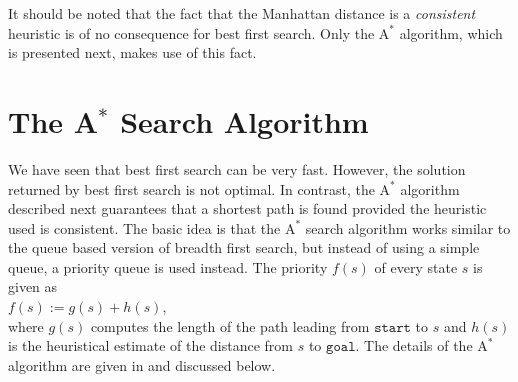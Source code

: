 It should be noted that the fact that the Manhattan distance is a \emph{\color{blue}consistent} heuristic is of
no consequence for best first search.  Only the $\mathrm{A}^*$ algorithm, which is presented next, makes use of
this fact.

\section{The A$^*$ Search Algorithm}
We have seen that best first search can be very fast.  However, the solution returned by best first search is
not optimal.  In contrast, the $\mathrm{A}^*$ algorithm described next guarantees that a shortest path is found
provided the heuristic used is consistent.   The basic idea is that the
$\mathrm{A}^*$ search algorithm works similar to the queue based version of breadth first search, but instead
of using a simple queue, a priority queue is used instead.  The priority $f(s)$ of every state $s$ is given as
\\[0.2cm]
\hspace*{1.3cm}
$f(s) := g(s) + h(s)$,
\\[0.2cm]
where $g(s)$ computes the length of the path leading from $\mathtt{start}$ to $s$ and $h(s)$ is the heuristical
estimate of the distance from $s$ to $\mathtt{goal}$.  The details of the $\mathrm{A}^*$ algorithm are given in
 and discussed below.


